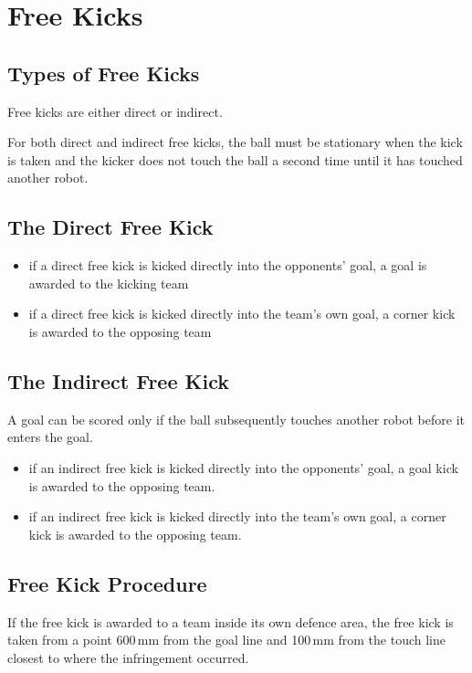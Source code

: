 \section{Free Kicks}\label{sec:free-kicks}

\subsection{Types of Free Kicks}
Free kicks are either direct or indirect.

For both direct and indirect free kicks, the ball must be stationary when the kick is taken and the kicker does not touch the ball a second time until it has touched another robot.

\subsection{The Direct Free Kick}
\begin{itemize}
\item if a direct free kick is kicked directly into the opponents' goal, a goal is awarded to the
kicking team
\item if a direct free kick is kicked directly into the team's own goal, a corner kick is awarded
to the
opposing team
\end{itemize}

\subsection{The Indirect Free Kick}
A goal can be scored only if the ball subsequently touches another robot before it enters the goal.

\begin{itemize}
\item if an indirect free kick is kicked directly into the opponents' goal, a goal kick is awarded
to the opposing team.
\item if an indirect free kick is kicked directly into the team's own goal, a corner kick is
awarded to the opposing team.
\end{itemize}

\subsection{Free Kick Procedure}
If the free kick is awarded to a team inside its own defence area, the free kick is taken from a point 600\,mm from the goal line and 100\,mm from the touch line closest to where the infringement occurred.

